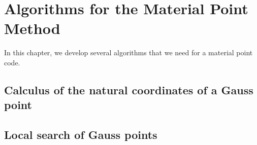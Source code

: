 
\section{Algorithms for the Material Point Method}
\label{sec:algor-mater-point}

In this chapter, we develop several algorithms that we need for a
material point code.

\subsection{Calculus of the natural coordinates of a Gauss point}
\label{sec:calc-natur-coord}


\subsection{Local search of Gauss points}
\label{sec:local-search-gauss}






